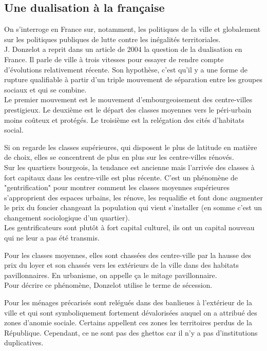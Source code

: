 \documentclass[12pt, a4paper, openany]{book}
\begin{document}
\subsection{Une dualisation à la française}

On s'interroge en France sur, notamment, les politiques de la ville et globalement sur les politiques publiques de lutte contre les inégalités territoriales. \\
J. Donzelot a reprit dans un article de 2004 la question de la dualisation en France. Il parle de ville à trois vitesses pour essayer de rendre compte d'évolutions relativement récente. Son hypothèse, c'est qu'il y a une forme de rupture qualifiable à partir d'un triple mouvement de séparation entre les groupes sociaux et qui se combine. \\
Le premier mouvement est le mouvement d'embourgeoisement des centre-villes prestigieux. Le deuxième est le départ des classes moyennes vers le péri-urbain moins coûteux et protégés. Le troisième est la relégation des cités d'habitats social. 


Si on regarde les classes supérieures, qui disposent le plus de latitude en matière de choix, elles se concentrent de plus en plus sur les centre-villes rénovés. \\
Sur les quartiers bourgeois, la tendance est ancienne mais l'arrivée des classes à fort capitaux dans les centre-ville est plus récente. C'est un phénomène de "gentrification" pour montrer comment les classes moyennes supérieures s'approprient des espaces urbains, les rénove, les requalifie et font donc augmenter le prix du foncier changeant la population qui vient s'installer (en somme c'est un changement sociologique d'un quartier). \\
Les gentrificateurs sont plutôt à fort capital culturel, ils ont un capital nouveau qui ne leur a pas été transmis.


Pour les classes moyennes, elles sont chassées des centre-ville par la hausse des prix du loyer et son chassés vers les extérieurs de la ville dans des habitats pavillonnaires. En urbanisme, on appelle ça le mitage pavillonnaire. \\
Pour décrire ce phénomène, Donzelot utilise le terme de sécession. 


Pour les ménages précarisés sont relégués dans des banlieues à l'extérieur de la ville et qui sont symboliquement fortement dévalorisées auquel on a attribué des zones d'anomie sociale. Certains appellent ces zones les territoires perdus de la République. Cependant, ce ne sont pas des ghettos car il n'y a pas d'institutions duplicatives. 
\end{document}
